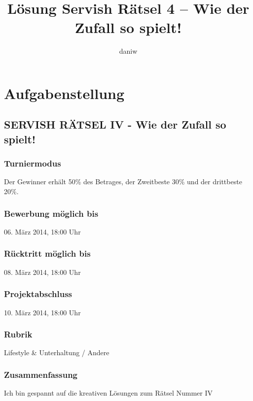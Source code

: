 \documentclass[a4paper, 10pt, fleqn]{article}
\title{Lösung Servish Rätsel 4 -- Wie der Zufall so spielt!}
\author{daniw}
\begin{document}
\maketitle
\newpage
\tableofcontents
\newpage

\section{Aufgabenstellung}

\subsection*{SERVISH RÄTSEL IV - Wie der Zufall so spielt!}

\subsubsection*{Turniermodus}
Der Gewinner erhält 50\% des Betrages, der Zweitbeste 30\% und der drittbeste 20\%. 

\subsubsection*{Bewerbung möglich bis}
06. März 2014, 
18:00 Uhr 

\subsubsection*{Rücktritt möglich bis}
08. März 2014, 
18:00 Uhr 

\subsubsection*{Projektabschluss}
10. März 2014, 
18:00 Uhr 

\subsubsection*{Rubrik}
Lifestyle \& Unterhaltung / Andere

\subsubsection*{Zusammenfassung}
Ich bin gespannt auf die kreativen Lösungen zum Rätsel Nummer IV
\end{document}
